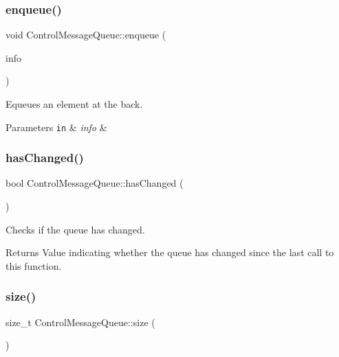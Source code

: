 \subsubsection{\texorpdfstring{enqueue()}{enqueue()}}
{\footnotesize\ttfamily void Control\+Message\+Queue\+::enqueue (\begin{DoxyParamCaption}\item[{\mbox{\hyperlink{structControlMessageQueue_1_1ControlMessageInfo}{Control\+Message\+Queue\+::\+Control\+Message\+Info}}}]{info }\end{DoxyParamCaption})}



Equeues an element at the back. 


\begin{DoxyParams}[1]{Parameters}
\mbox{\tt in}  & {\em info} & \\
\hline
\end{DoxyParams}
\mbox{\label{classControlMessageQueue_ad0d97de85cb34b781fde757b665fb22e}} 
\subsubsection{\texorpdfstring{has\+Changed()}{hasChanged()}}
{\footnotesize\ttfamily bool Control\+Message\+Queue\+::has\+Changed (\begin{DoxyParamCaption}{ }\end{DoxyParamCaption})}



Checks if the queue has changed. 

\begin{DoxyReturn}{Returns}
Value indicating whether the queue has changed since the last call to this function. 
\end{DoxyReturn}
\mbox{\label{classControlMessageQueue_a3b2d120facfc58fcdc315a806d76851a}} 
\subsubsection{\texorpdfstring{size()}{size()}}
{\footnotesize\ttfamily size\+\_\+t Control\+Message\+Queue\+::size (\begin{DoxyParamCaption}{ }\end{DoxyParamCaption})}



